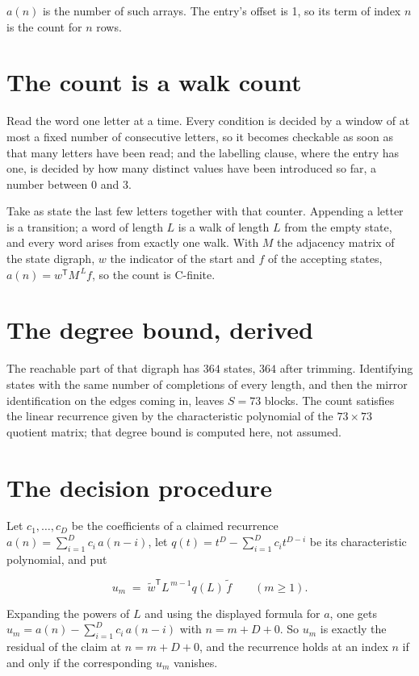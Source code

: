 \documentclass[11pt]{article}
\theoremstyle{definition}
\begin{document}
$a(n)$ is the number of such arrays. The entry's offset is 1, so its term of index $n$ is the count for $n$ rows.

\section{The count is a walk count}

Read the word one letter at a time. Every condition is decided by a window of at most a fixed number of consecutive letters, so it becomes checkable as soon as that many letters have been read; and the labelling clause, where the entry has one, is decided by how many distinct values have been introduced so far, a number between $0$ and 3.

Take as state the last few letters together with that counter. Appending a letter is a transition; a word of length $L$ is a walk of length $L$ from the empty state, and every word arises from exactly one walk. With $M$ the adjacency matrix of the state digraph, $w$ the indicator of the start and $f$ of the accepting states, $a(n) = w^{\mathsf T}M^{\,L}f$, so the count is C-finite.

\section{The degree bound, derived}

The reachable part of that digraph has $364$ states, $364$ after trimming. Identifying states with the same number of completions of every length, and then the mirror identification on the edges coming in, leaves $S = 73$ blocks. The count satisfies the linear recurrence given by the characteristic polynomial of the $73\times73$ quotient matrix; that degree bound is computed here, not assumed.

\section{The decision procedure}

Let $c_1,\dots,c_D$ be the coefficients of a claimed recurrence $a(n) = \sum_{i=1}^{D} c_i\,a(n-i)$, let $q(t) = t^{D} - \sum_{i=1}^{D} c_i t^{D-i}$ be its characteristic polynomial, and put

\[u_m \;=\; \tilde w^{\mathsf T} L^{\,m-1} q(L)\,\tilde f \qquad (m \ge 1).\]

Expanding the powers of $L$ and using the displayed formula for $a$, one gets $u_m = a(n) - \sum_{i=1}^{D} c_i\,a(n-i)$ with $n = m + D + 0$. So $u_m$ is exactly the residual of the claim at $n = m + D + 0$, and the recurrence holds at an index $n$ if and only if the corresponding $u_m$ vanishes.
\end{document}
